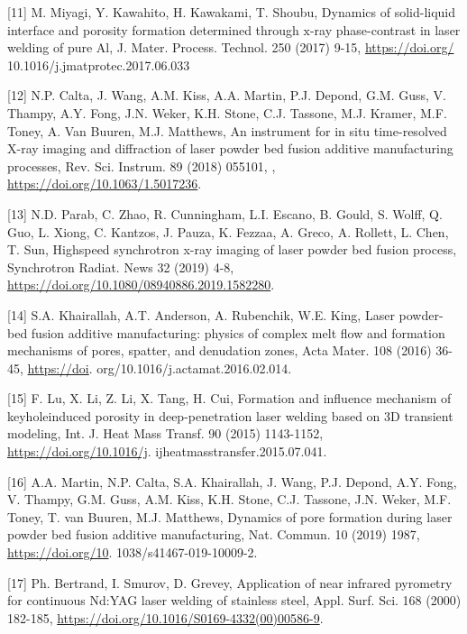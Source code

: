 \documentclass[10pt]{article}
\begin{document}
[11] M. Miyagi, Y. Kawahito, H. Kawakami, T. Shoubu, Dynamics of solid-liquid interface and porosity formation determined through $\mathrm{x}$-ray phase-contrast in laser welding of pure Al, J. Mater. Process. Technol. 250 (2017) 9-15, \href{https://doi.org/}{https://doi.org/} 10.1016/j.jmatprotec.2017.06.033

[12] N.P. Calta, J. Wang, A.M. Kiss, A.A. Martin, P.J. Depond, G.M. Guss, V. Thampy, A.Y. Fong, J.N. Weker, K.H. Stone, C.J. Tassone, M.J. Kramer, M.F. Toney, A. Van Buuren, M.J. Matthews, An instrument for in situ time-resolved X-ray imaging and diffraction of laser powder bed fusion additive manufacturing processes, Rev. Sci. Instrum. 89 (2018) 055101, , \href{https://doi.org/10.1063/1.5017236}{https://doi.org/10.1063/1.5017236}.

[13] N.D. Parab, C. Zhao, R. Cunningham, L.I. Escano, B. Gould, S. Wolff, Q. Guo, L. Xiong, C. Kantzos, J. Pauza, K. Fezzaa, A. Greco, A. Rollett, L. Chen, T. Sun, Highspeed synchrotron x-ray imaging of laser powder bed fusion process, Synchrotron Radiat. News 32 (2019) 4-8, \href{https://doi.org/10.1080/08940886.2019.1582280}{https://doi.org/10.1080/08940886.2019.1582280}.

[14] S.A. Khairallah, A.T. Anderson, A. Rubenchik, W.E. King, Laser powder-bed fusion additive manufacturing: physics of complex melt flow and formation mechanisms of pores, spatter, and denudation zones, Acta Mater. 108 (2016) 36-45, \href{https://doi}{https://doi}. org/10.1016/j.actamat.2016.02.014.

[15] F. Lu, X. Li, Z. Li, X. Tang, H. Cui, Formation and influence mechanism of keyholeinduced porosity in deep-penetration laser welding based on 3D transient modeling, Int. J. Heat Mass Transf. 90 (2015) 1143-1152, \href{https://doi.org/10.1016/j}{https://doi.org/10.1016/j}. ijheatmasstransfer.2015.07.041.

[16] A.A. Martin, N.P. Calta, S.A. Khairallah, J. Wang, P.J. Depond, A.Y. Fong, V. Thampy, G.M. Guss, A.M. Kiss, K.H. Stone, C.J. Tassone, J.N. Weker, M.F. Toney, T. van Buuren, M.J. Matthews, Dynamics of pore formation during laser powder bed fusion additive manufacturing, Nat. Commun. 10 (2019) 1987, \href{https://doi.org/10}{https://doi.org/10}. 1038/s41467-019-10009-2.

[17] Ph. Bertrand, I. Smurov, D. Grevey, Application of near infrared pyrometry for continuous Nd:YAG laser welding of stainless steel, Appl. Surf. Sci. 168 (2000) 182-185, \href{https://doi.org/10.1016/S0169-4332(00)00586-9}{https://doi.org/10.1016/S0169-4332(00)00586-9}.
\end{document}
